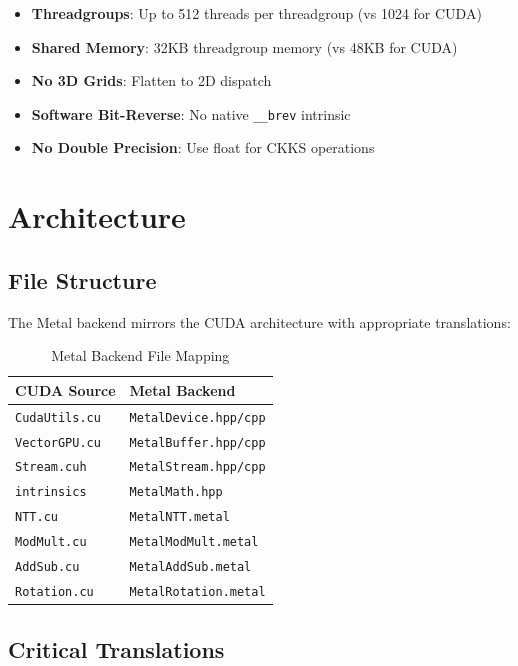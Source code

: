 \documentclass[11pt,oneside]{article}
\begin{document}
\begin{itemize}
    \item \textbf{Threadgroups}: Up to 512 threads per threadgroup (vs 1024 for CUDA)
    \item \textbf{Shared Memory}: 32KB threadgroup memory (vs 48KB for CUDA)
    \item \textbf{No 3D Grids}: Flatten to 2D dispatch
    \item \textbf{Software Bit-Reverse}: No native \texttt{\_\_brev} intrinsic
    \item \textbf{No Double Precision}: Use float for CKKS operations
\end{itemize}

\section{Architecture}

\subsection{File Structure}

The Metal backend mirrors the CUDA architecture with appropriate translations:

\begin{table}[h]
\centering
\caption{Metal Backend File Mapping}
\begin{tabular}{ll}
\toprule
CUDA Source & Metal Backend \\
\midrule
\texttt{CudaUtils.cu} & \texttt{MetalDevice.hpp/cpp} \\
\texttt{VectorGPU.cu} & \texttt{MetalBuffer.hpp/cpp} \\
\texttt{Stream.cuh} & \texttt{MetalStream.hpp/cpp} \\
\texttt{intrinsics} & \texttt{MetalMath.hpp} \\
\texttt{NTT.cu} & \texttt{MetalNTT.metal} \\
\texttt{ModMult.cu} & \texttt{MetalModMult.metal} \\
\texttt{AddSub.cu} & \texttt{MetalAddSub.metal} \\
\texttt{Rotation.cu} & \texttt{MetalRotation.metal} \\
\bottomrule
\end{tabular}
\end{table}

\subsection{Critical Translations}
\end{document}
